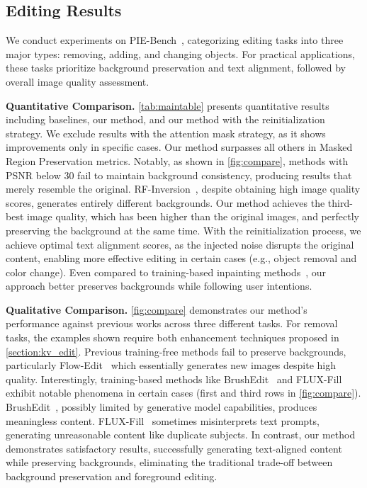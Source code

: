 \subsection{Editing Results}
We conduct experiments on PIE-Bench~\cite{ju2024pnp}, categorizing editing tasks into three major types: removing, adding, and changing objects. For practical applications, these tasks prioritize background preservation and text alignment, followed by overall image quality assessment.

\noindent\textbf{Quantitative Comparison.} \cref{tab:maintable} presents quantitative results including baselines, our method, and our method with the reinitialization strategy. We exclude results with the attention mask strategy, as it shows improvements only in specific cases. Our method surpasses all others in Masked Region Preservation metrics. Notably, as shown in \cref{fig:compare}, methods with PSNR below 30 fail to maintain background consistency, producing results that merely resemble the original. RF-Inversion~\cite{rout2024semantic}, despite obtaining high image quality scores, generates entirely different backgrounds. Our method achieves the third-best image quality, which has been higher than the original images, and perfectly preserving the background at the same time. With the reinitialization process, we achieve optimal text alignment scores, as the injected noise disrupts the original content, enabling more effective editing in certain cases (e.g., object removal and color change). Even compared to training-based inpainting methods~\cite{li2024brushedit,flux}, our approach better preserves backgrounds while following user intentions.

\noindent\textbf{Qualitative Comparison.} \cref{fig:compare} demonstrates our method's performance against previous works across three different tasks. For removal tasks, the examples shown require both enhancement techniques proposed in \cref{section:kv_edit}. Previous training-free methods fail to preserve backgrounds, particularly Flow-Edit~\cite{kulikov2024flowedit} which essentially generates new images despite high quality. Interestingly, training-based methods like BrushEdit~\cite{li2024brushedit} and FLUX-Fill~\cite{flux} exhibit notable phenomena in certain cases (first and third rows in \cref{fig:compare}). BrushEdit~\cite{li2024brushedit}, possibly limited by generative model capabilities, produces meaningless content. FLUX-Fill~\cite{flux} sometimes misinterprets text prompts, generating unreasonable content like duplicate subjects. In contrast, our method demonstrates satisfactory results, successfully generating text-aligned content while preserving backgrounds, eliminating the traditional trade-off between background preservation and foreground editing.

